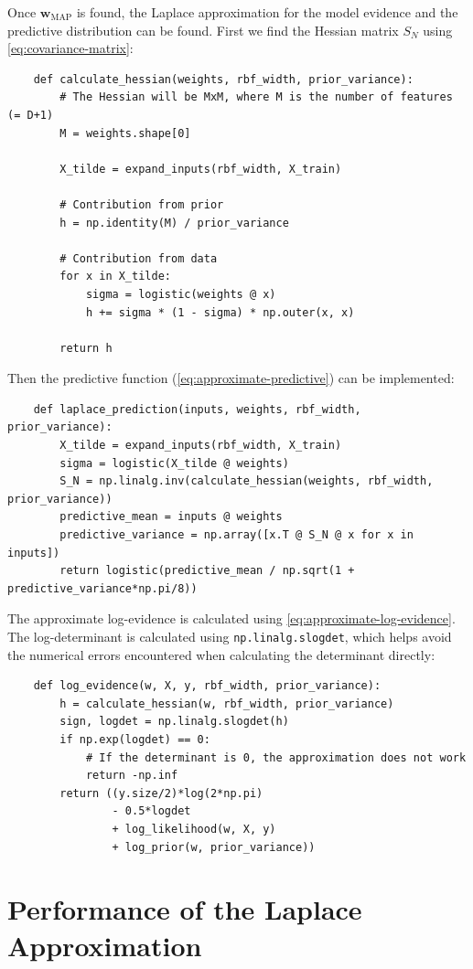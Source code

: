 \documentclass[a4paper]{article}
\begin{document}
    Once $\bm{w}_{\text{MAP}}$ is found, the Laplace approximation for the model evidence and the predictive distribution can be found. First we find the Hessian matrix $S_N$ using \autoref{eq:covariance-matrix}:
    \begin{verbatim}
    def calculate_hessian(weights, rbf_width, prior_variance):
        # The Hessian will be MxM, where M is the number of features (= D+1)
        M = weights.shape[0]

        X_tilde = expand_inputs(rbf_width, X_train)

        # Contribution from prior
        h = np.identity(M) / prior_variance

        # Contribution from data
        for x in X_tilde:
            sigma = logistic(weights @ x)
            h += sigma * (1 - sigma) * np.outer(x, x)

        return h
    \end{verbatim}
    Then the predictive function (\autoref{eq:approximate-predictive}) can be implemented:
    \begin{verbatim}
    def laplace_prediction(inputs, weights, rbf_width, prior_variance):
        X_tilde = expand_inputs(rbf_width, X_train)
        sigma = logistic(X_tilde @ weights)
        S_N = np.linalg.inv(calculate_hessian(weights, rbf_width, prior_variance))
        predictive_mean = inputs @ weights
        predictive_variance = np.array([x.T @ S_N @ x for x in inputs])
        return logistic(predictive_mean / np.sqrt(1 + predictive_variance*np.pi/8))
    \end{verbatim}
    The approximate log-evidence is calculated using \autoref{eq:approximate-log-evidence}. The log-determinant is calculated using \verb`np.linalg.slogdet`, which helps avoid the numerical errors encountered when calculating the determinant directly:
    \begin{verbatim}
    def log_evidence(w, X, y, rbf_width, prior_variance):
        h = calculate_hessian(w, rbf_width, prior_variance)
        sign, logdet = np.linalg.slogdet(h)
        if np.exp(logdet) == 0:
            # If the determinant is 0, the approximation does not work
            return -np.inf
        return ((y.size/2)*log(2*np.pi)
                - 0.5*logdet
                + log_likelihood(w, X, y)
                + log_prior(w, prior_variance))
    \end{verbatim}

    \section{Performance of the Laplace Approximation}\label{sec:performance}
\end{document}
